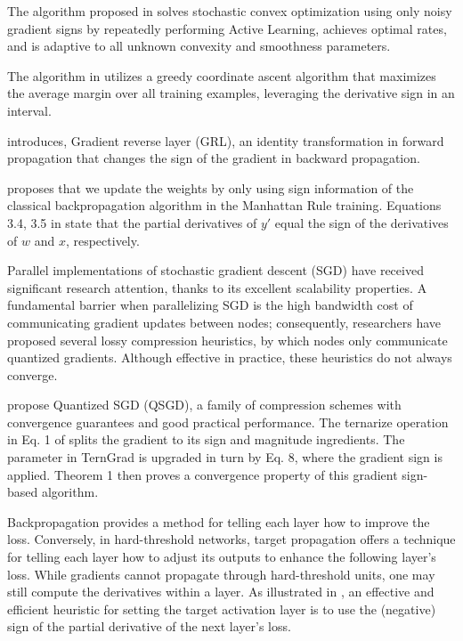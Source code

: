 \documentclass[11pt]{book}
\begin{document}
The algorithm proposed in \cite{ramdas2013algorithmic} solves stochastic
convex optimization using only noisy gradient signs by repeatedly
performing Active Learning, achieves optimal rates, and is adaptive
to all unknown convexity and smoothness parameters. 

The algorithm in \cite{zhai2013direct} utilizes a greedy coordinate
ascent algorithm that maximizes the average margin over all training
examples, leveraging the derivative sign in an interval.

\cite{ganin2015unsupervised} introduces, Gradient reverse layer (GRL),
an identity transformation in forward propagation that changes the
sign of the gradient in backward propagation.

\cite{zamanidoost2015manhattan} proposes that we update the weights
by only using sign information of the classical backpropagation algorithm
in the Manhattan Rule training. Equations 3.4, 3.5 in \cite{wang2016study}
state that the partial derivatives of $y'$ equal the sign of the
derivatives of $w$ and $x$, respectively.

Parallel implementations of stochastic gradient descent (SGD) have
received significant research attention, thanks to its excellent scalability
properties. A fundamental barrier when parallelizing SGD is the high
bandwidth cost of communicating gradient updates between nodes; consequently,
researchers have proposed several lossy compression heuristics, by
which nodes only communicate quantized gradients. Although effective
in practice, these heuristics do not always converge.

\cite{alistarh2017qsgd} propose Quantized SGD (QSGD), a family of
compression schemes with convergence guarantees and good practical
performance. The \textquotedbl ternarize\textquotedbl{} operation in
Eq. 1 of \cite{wen2017terngrad} splits the gradient to its sign and
magnitude ingredients. The parameter in TernGrad is upgraded in turn
by Eq. 8, where the gradient sign is applied. Theorem 1 then proves
a convergence property of this gradient sign-based algorithm.

Backpropagation provides a method for telling each layer how to improve
the loss. Conversely, in hard-threshold networks, target propagation
offers a technique for telling each layer how to adjust its outputs
to enhance the following layer's loss. While gradients cannot propagate
through hard-threshold units, one may still compute the derivatives
within a layer. As illustrated in \cite{friesen2017deep}, an effective
and efficient heuristic for setting the target activation layer is
to use the (negative) sign of the partial derivative of the next layer's
loss.
\end{document}
